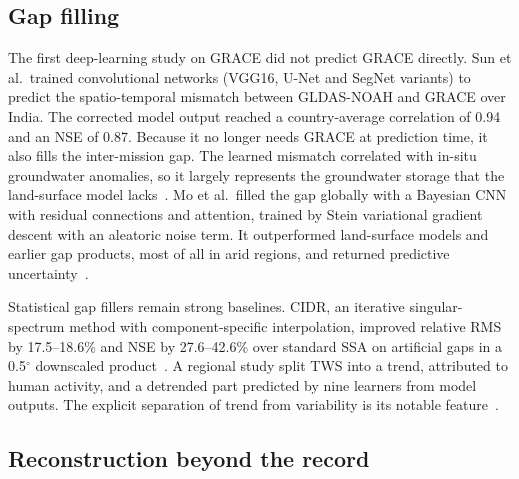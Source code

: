 \subsection{Gap filling}

The first deep-learning study on GRACE did not predict GRACE directly. Sun et al.\ trained convolutional networks (VGG16, U-Net and SegNet variants) to predict the spatio-temporal mismatch between GLDAS-NOAH and GRACE over India. The corrected model output reached a country-average correlation of 0.94 and an NSE of 0.87. Because it no longer needs GRACE at prediction time, it also fills the inter-mission gap. The learned mismatch correlated with in-situ groundwater anomalies, so it largely represents the groundwater storage that the land-surface model lacks~\cite{sun2019combining}. Mo et al.\ filled the gap globally with a Bayesian CNN with residual connections and attention, trained by Stein variational gradient descent with an aleatoric noise term. It outperformed land-surface models and earlier gap products, most of all in arid regions, and returned predictive uncertainty~\cite{mo2022bayesian}.

Statistical gap fillers remain strong baselines. CIDR, an iterative singular-spectrum method with component-specific interpolation, improved relative RMS by 17.5--18.6\% and NSE by 27.6--42.6\% over standard SSA on artificial gaps in a 0.5$^\circ$ downscaled product~\cite{gao2025cidr}. A regional study split TWS into a trend, attributed to human activity, and a detrended part predicted by nine learners from model outputs. The explicit separation of trend from variability is its notable feature~\cite{mousavimehr2025nonstationary}.

\subsection{Reconstruction beyond the record}

